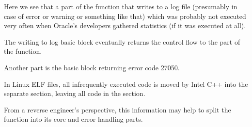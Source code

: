 Here we see that a part of the function that writes to a log file (presumably in case of error or warning
or something like that) which was probably not executed very often when Oracle's developers gathered 
statistics (if it was executed at all).

The writing to log basic block eventually returns the control flow to the  part of the function.

Another  part is the \gls{basic block} returning error code 27050.

In Linux ELF files, all infrequently executed code is moved by Intel C++ into the separate 
 section, leaving all  code in the  section.

From a reverse engineer's perspective, this information may help to split the function
into its core and error handling parts.

